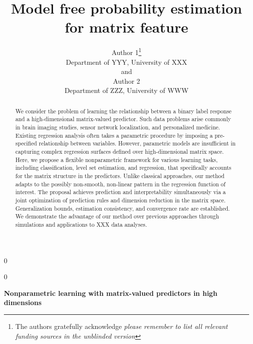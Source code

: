 \documentclass[12pt]{article}
\newcommand{\blind}{0}
\begin{document}
\setcounter{secnumdepth}{3}
%

\def\spacingset#1{\renewcommand{\baselinestretch}%
{#1}\small\normalsize} \spacingset{1}
\def\fixme#1#2{\textbf{\color{red}[FIXME (#1): #2]}}





\blind
{
  \title{\bf Model free probability estimation for matrix feature}
  \author{Author 1\thanks{
    The authors gratefully acknowledge \textit{please remember to list all relevant funding sources in the unblinded version}}\hspace{.2cm}\\
    Department of YYY, University of XXX\\
    and \\
    Author 2 \\
    Department of ZZZ, University of WWW}
  \maketitle
} \fi

\blind
{
  \bigskip
  \bigskip
  \bigskip
  \begin{center}
    {\LARGE\bf Nonparametric learning with matrix-valued predictors in high dimensions}
\end{center}
  \medskip
} \fi

\bigskip
\begin{abstract}
We consider the problem of learning the relationship between a binary label response and a high-dimensional matrix-valued predictor. Such data problems arise commonly in brain imaging studies, sensor network localization, and personalized medicine. Existing regression analysis often takes a parametric procedure by imposing a pre-specified relationship between variables. However, parametric models are insufficient in capturing complex regression surfaces defined over high-dimensional matrix space. Here, we propose a flexible nonparametric framework for various learning tasks, including classification, level set estimation, and regression, that specifically accounts for the matrix structure in the predictors. Unlike classical approaches, our method adapts to the possibly non-smooth, non-linear pattern in the regression function of interest. The proposal achieves prediction and interpretability simultaneously via a joint optimization of prediction rules and dimension reduction in the matrix space. Generalization bounds, estimation consistency, and convergence rate are established. We demonstrate the advantage of our method over previous approaches through simulations and applications to  {\color{red}XXX} data analyses. 
\end{abstract}
\end{document}
